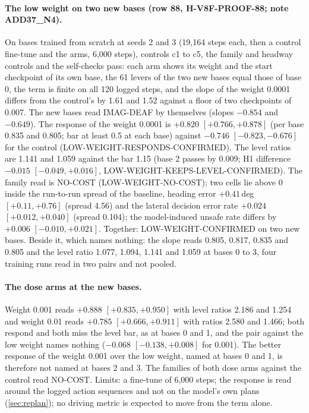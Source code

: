 \paragraph{The low weight on two new bases (row 88, H-V8F-PROOF-88; note ADD37\_N4).} On bases trained from scratch at seeds 2 and 3 (19,164 steps each, then a control fine-tune and the arms, 6,000 steps), controls c1 to c5, the family and headway controls and the self-checks pass: each arm shows its weight and the start checkpoint of its own base, the 61 levers of the two new bases equal those of base 0, the term is finite on all 120 logged steps, and the slope of the weight 0.0001 differs from the control's by 1.61 and 1.52 against a floor of two checkpoints of 0.007. The new bases read IMAG-DEAF by themselves (slopes $-0.854$ and $-0.649$). The response of the weight 0.0001 is $+0.820$ $[+0.766,+0.878]$ (per base 0.835 and 0.805; bar at least 0.5 at each base) against $-0.746$ $[-0.823,-0.676]$ for the control (LOW-WEIGHT-RESPONDS-CONFIRMED). The level ratios are 1.141 and 1.059 against the bar 1.15 (base 2 passes by 0.009; H1 difference $-0.015$ $[-0.049,+0.016]$, LOW-WEIGHT-KEEPS-LEVEL-CONFIRMED). The family read is NO-COST (LOW-WEIGHT-NO-COST); two cells lie above 0 inside the run-to-run spread of the baseline, heading error $+0.41$\,deg $[+0.11,+0.76]$ (spread 4.56) and the lateral decision error rate $+0.024$ $[+0.012,+0.040]$ (spread 0.104); the model-induced unsafe rate differs by $+0.006$ $[-0.010,+0.021]$. Together: LOW-WEIGHT-CONFIRMED on two new bases. Beside it, which names nothing: the slope reads 0.805, 0.817, 0.835 and 0.805 and the level ratio 1.077, 1.094, 1.141 and 1.059 at bases 0 to 3, four training runs read in two pairs and not pooled.

\paragraph{The dose arms at the new bases.} Weight 0.001 reads $+0.888$ $[+0.835,+0.950]$ with level ratios 2.186 and 1.254 and weight 0.01 reads $+0.785$ $[+0.666,+0.911]$ with ratios 2.580 and 1.466; both respond and both miss the level bar, as at bases 0 and 1, and the pair against the low weight names nothing ($-0.068$ $[-0.138,+0.008]$ for 0.001). The better response of the weight 0.001 over the low weight, named at bases 0 and 1, is therefore not named at bases 2 and 3. The families of both dose arms against the control read NO-COST. Limits: a fine-tune of 6,000 steps; the response is read around the logged action sequences and not on the model's own plans (\cref{sec:replan}); no driving metric is expected to move from the term alone.

